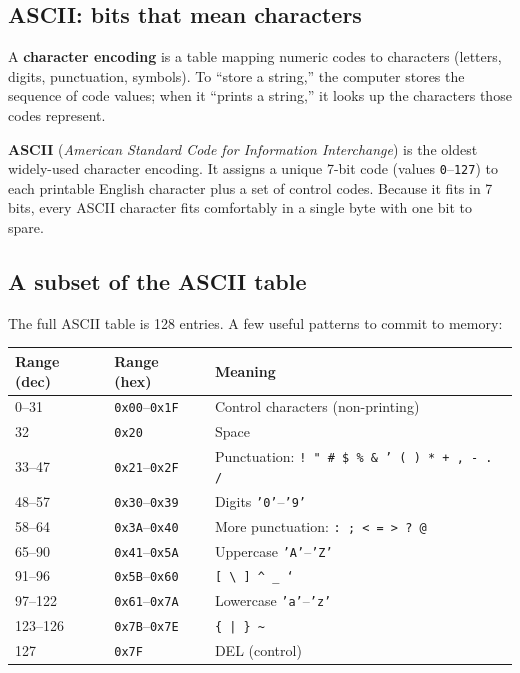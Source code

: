 \documentclass[11pt]{article}
\begin{document}
\subsection{ASCII: bits that mean characters}

\begin{defnbox}
A \textbf{character encoding} is a table mapping numeric codes to
characters (letters, digits, punctuation, symbols). To ``store a
string,'' the computer stores the sequence of code values; when it
``prints a string,'' it looks up the characters those codes represent.
\end{defnbox}

\begin{defnbox}[ASCII]
\textbf{ASCII} (\emph{American Standard Code for Information
Interchange}) is the oldest widely-used character encoding. It
assigns a unique 7-bit code (values \texttt{0}--\texttt{127}) to each
printable English character plus a set of control codes. Because it
fits in 7 bits, every ASCII character fits comfortably in a single
byte with one bit to spare.
\end{defnbox}

\subsection{A subset of the ASCII table}

The full ASCII table is 128 entries. A few useful patterns to commit
to memory:

\begin{center}
\small
\begin{tabular}{lll}
\textbf{Range (dec)} & \textbf{Range (hex)} & \textbf{Meaning} \\
\hline
0--31  & \texttt{0x00}--\texttt{0x1F} & Control characters (non-printing) \\
32     & \texttt{0x20}                & Space \\
33--47 & \texttt{0x21}--\texttt{0x2F} & Punctuation: \texttt{! " \# \$ \% \& ' ( ) * + , - . /} \\
48--57 & \texttt{0x30}--\texttt{0x39} & Digits \texttt{'0'}--\texttt{'9'} \\
58--64 & \texttt{0x3A}--\texttt{0x40} & More punctuation: \texttt{: ; < = > ? @} \\
65--90 & \texttt{0x41}--\texttt{0x5A} & Uppercase \texttt{'A'}--\texttt{'Z'} \\
91--96 & \texttt{0x5B}--\texttt{0x60} & \texttt{[ \textbackslash\ ] \textasciicircum\ \_ `} \\
97--122 & \texttt{0x61}--\texttt{0x7A} & Lowercase \texttt{'a'}--\texttt{'z'} \\
123--126 & \texttt{0x7B}--\texttt{0x7E} & \texttt{\{ | \} \textasciitilde} \\
127 & \texttt{0x7F} & DEL (control) \\
\end{tabular}
\normalsize
\end{center}
\end{document}
